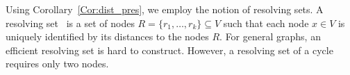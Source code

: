 \documentclass[fleqn,11pt]{article}
\begin{document}
Using Corollary~\ref{Cor:dist_pres}, we employ the notion of resolving sets. A resolving set~\cite{tillquist2023getting} is a set of nodes $R=\{r_1,\hdots,r_k\}\subseteq V$ such that each node $x\in V$ is uniquely identified by its distances to the nodes $R$. For general graphs, an efficient resolving set is hard to construct. However, a resolving set of a cycle requires only two nodes.

%		
%		
%		
%		
%		
\end{document}
